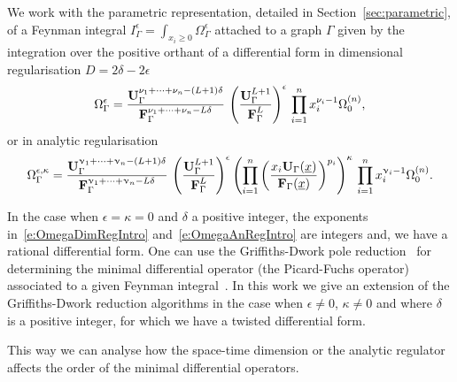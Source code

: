 \documentclass[a4paper,12pt]{article}
\numberwithin{equation}{section}
\numberwithin{figure}{section}
\begin{document}
We work with the parametric representation, detailed in
Section~\ref{sec:parametric}, of a Feynman integral $
I_\Gamma^\epsilon=\int_{x_i\geq0}  \Omega_\Gamma^\epsilon$ attached to a
graph $\Gamma$
given by the integration over the positive orthant of a
differential form in dimensional regularisation
$D=2\delta-2\epsilon$
\begin{equation}\label{e:OmegaDimRegIntro}
  \Omega^\epsilon_\Gamma = { \textbf{U}_\Gamma ^{\nu_1+\cdots+\nu_n-(L+1)\delta}  \over \textbf{F}_\Gamma ^{\nu_1+\cdots+\nu_n-L\delta} }\,
  \left(\textbf{U}_\Gamma^{L+1}\over \textbf{F}_\Gamma^{L}\right)^{\epsilon} \, \prod_{i=1}^n x_i^{\nu_i-1} \Omega^{(n)}_0,
\end{equation}
or in analytic regularisation
\begin{equation}\label{e:OmegaAnRegIntro}
  \Omega^{\epsilon,\kappa}_\Gamma = { \textbf{U}_\Gamma ^{\upnu_1+\cdots+\upnu_n-(L+1)\delta}  \over \textbf{F}_\Gamma ^{\upnu_1+\cdots+\upnu_n-L\delta} }\, \left(\textbf{U}_\Gamma^{L+1}\over \textbf{F}_\Gamma^{L}\right)^{\epsilon} 
  \left(\prod_{i=1}^n \left(x_i \textbf{U}_\Gamma(\underline x)\over
      \textbf{F}_\Gamma(\underline x)\right)^{p_i}\right)^{\kappa} \, \prod_{i=1}^n x_i^{\upnu_i-1} \Omega^{(n)}_0.
\end{equation}


In the case when $\epsilon=\kappa=0$ and $\delta$ a positive integer, the exponents
in~\eqref{e:OmegaDimRegIntro} and~\eqref{e:OmegaAnRegIntro} are
integers and,
we have a rational differential form. One can use the  Griffiths-Dwork
pole reduction~\cite{Griffiths_1969,Griffith1,Griffith2,Dwork_1962,Dwork_1964} for determining the minimal differential operator (the
Picard-Fuchs operator) associated to a given Feynman
integral~\cite{Bloch:2016izu,Vanhove:2018mto,Lairez:2022zkj}.
In this work we give an extension of the Griffiths-Dwork reduction  algorithms in the case when
$\epsilon\neq0$, $\kappa\neq0$ and where $\delta$ is a positive
integer, for which   we have a twisted differential
form.

 This way we
can analyse how the space-time dimension or the analytic regulator  affects the order of the
minimal differential operators.
\end{document}
